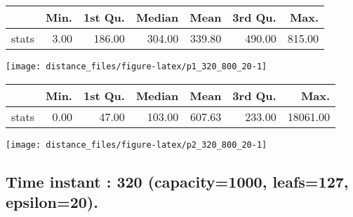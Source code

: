 \documentclass[
  9pt,
  landscape]{article}
\begin{document}
\begin{minipage}{0.5\textwidth} 
\centering 
\begin{tabular}{rrrrrrr}
  \hline
 & Min. & 1st Qu. & Median & Mean & 3rd Qu. & Max. \\ 
  \hline
stats & 3.00 & 186.00 & 304.00 & 339.80 & 490.00 & 815.00 \\ 
   \hline
\end{tabular}
\vspace{0.5cm} 


\texttt{[image: distance\_files/figure-latex/p1\_320\_800\_20-1]} 

\end{minipage} 
\begin{minipage}{0.5\textwidth} 
\centering 
\begin{tabular}{rrrrrrr}
  \hline
 & Min. & 1st Qu. & Median & Mean & 3rd Qu. & Max. \\ 
  \hline
stats & 0.00 & 47.00 & 103.00 & 607.63 & 233.00 & 18061.00 \\ 
   \hline
\end{tabular}
\vspace{0.5cm} 


\texttt{[image: distance\_files/figure-latex/p2\_320\_800\_20-1]} 

\end{minipage}

\pagebreak

\hypertarget{time-instant-320-capacity1000-leafs127-epsilon20.}{%
\subsection{Time instant : 320 (capacity=1000, leafs=127,
epsilon=20).}\label{time-instant-320-capacity1000-leafs127-epsilon20.}}
\end{document}
